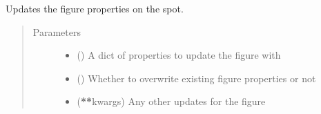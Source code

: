 \documentclass[letterpaper,10pt,english]{sphinxmanual}
\begin{document}
\begin{fulllineitems}
\begin{fulllineitems}
\end{fulllineitems}


\begin{fulllineitems}
\label{\detokenize{builder:geohexviz.builder.PlotBuilder.update_figure}}
\sphinxAtStartPar
Updates the figure properties on the spot.
\begin{quote}\begin{description}
\item[{Parameters}] \leavevmode\begin{itemize}
\item {} 
\sphinxAtStartPar
{} () \textendash{} A dict of properties to update the figure with

\item {} 
\sphinxAtStartPar
{} () \textendash{} Whether to overwrite existing figure properties or not

\item {} 
\sphinxAtStartPar
{} ({\color{red}\bfseries{}**}kwargs) \textendash{} Any other updates for the figure

\end{itemize}

\end{description}\end{quote}

\end{fulllineitems}



\end{fulllineitems}
\end{document}
